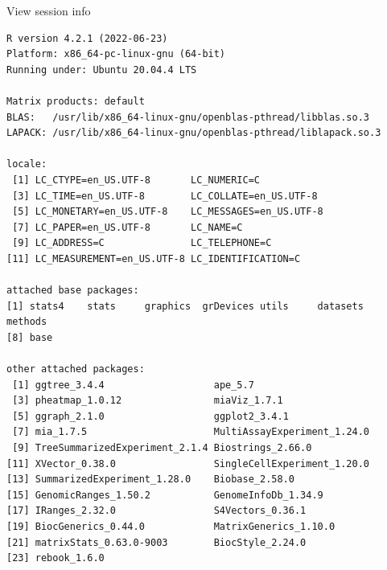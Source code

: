 \documentclass[
]{book}
\begin{document}
View session info

\begin{verbatim}
R version 4.2.1 (2022-06-23)
Platform: x86_64-pc-linux-gnu (64-bit)
Running under: Ubuntu 20.04.4 LTS

Matrix products: default
BLAS:   /usr/lib/x86_64-linux-gnu/openblas-pthread/libblas.so.3
LAPACK: /usr/lib/x86_64-linux-gnu/openblas-pthread/liblapack.so.3

locale:
 [1] LC_CTYPE=en_US.UTF-8       LC_NUMERIC=C              
 [3] LC_TIME=en_US.UTF-8        LC_COLLATE=en_US.UTF-8    
 [5] LC_MONETARY=en_US.UTF-8    LC_MESSAGES=en_US.UTF-8   
 [7] LC_PAPER=en_US.UTF-8       LC_NAME=C                 
 [9] LC_ADDRESS=C               LC_TELEPHONE=C            
[11] LC_MEASUREMENT=en_US.UTF-8 LC_IDENTIFICATION=C       

attached base packages:
[1] stats4    stats     graphics  grDevices utils     datasets  methods  
[8] base     

other attached packages:
 [1] ggtree_3.4.4                   ape_5.7                       
 [3] pheatmap_1.0.12                miaViz_1.7.1                  
 [5] ggraph_2.1.0                   ggplot2_3.4.1                 
 [7] mia_1.7.5                      MultiAssayExperiment_1.24.0   
 [9] TreeSummarizedExperiment_2.1.4 Biostrings_2.66.0             
[11] XVector_0.38.0                 SingleCellExperiment_1.20.0   
[13] SummarizedExperiment_1.28.0    Biobase_2.58.0                
[15] GenomicRanges_1.50.2           GenomeInfoDb_1.34.9           
[17] IRanges_2.32.0                 S4Vectors_0.36.1              
[19] BiocGenerics_0.44.0            MatrixGenerics_1.10.0         
[21] matrixStats_0.63.0-9003        BiocStyle_2.24.0              
[23] rebook_1.6.0                  


\end{verbatim}
\end{document}
